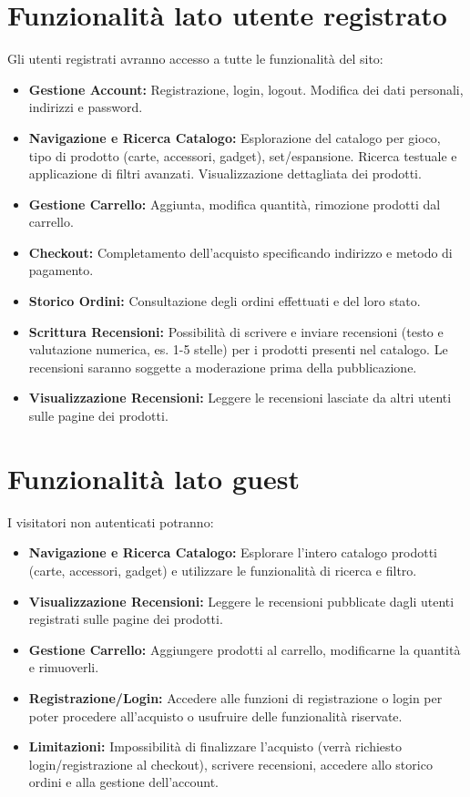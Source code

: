 \documentclass[14pt]{extreport}
\begin{document}
\section{Funzionalità lato utente registrato}
Gli utenti registrati avranno accesso a tutte le funzionalità del sito:
\begin{itemize}
    \item \textbf{Gestione Account:} Registrazione, login, logout. Modifica dei dati personali, indirizzi e password.
    \item \textbf{Navigazione e Ricerca Catalogo:} Esplorazione del catalogo per gioco, tipo di prodotto (carte, accessori, gadget), set/espansione. Ricerca testuale e applicazione di filtri avanzati. Visualizzazione dettagliata dei prodotti.
    \item \textbf{Gestione Carrello:} Aggiunta, modifica quantità, rimozione prodotti dal carrello.
    \item \textbf{Checkout:} Completamento dell'acquisto specificando indirizzo e metodo di pagamento.
    \item \textbf{Storico Ordini:} Consultazione degli ordini effettuati e del loro stato.
    \item \textbf{Scrittura Recensioni:} Possibilità di scrivere e inviare recensioni (testo e valutazione numerica, es. 1-5 stelle) per i prodotti presenti nel catalogo. Le recensioni saranno soggette a moderazione prima della pubblicazione.
    \item \textbf{Visualizzazione Recensioni:} Leggere le recensioni lasciate da altri utenti sulle pagine dei prodotti.
\end{itemize}


\section{Funzionalità lato guest}
I visitatori non autenticati potranno:
\begin{itemize}
    \item \textbf{Navigazione e Ricerca Catalogo:} Esplorare l'intero catalogo prodotti (carte, accessori, gadget) e utilizzare le funzionalità di ricerca e filtro.
    \item \textbf{Visualizzazione Recensioni:} Leggere le recensioni pubblicate dagli utenti registrati sulle pagine dei prodotti.
    \item \textbf{Gestione Carrello:} Aggiungere prodotti al carrello, modificarne la quantità e rimuoverli.
    \item \textbf{Registrazione/Login:} Accedere alle funzioni di registrazione o login per poter procedere all'acquisto o usufruire delle funzionalità riservate.
    \item \textbf{Limitazioni:} Impossibilità di finalizzare l'acquisto (verrà richiesto login/registrazione al checkout), scrivere recensioni, accedere allo storico ordini e alla gestione dell'account.
\end{itemize}
\end{document}
